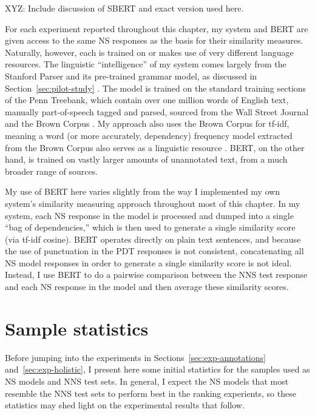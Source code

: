 XYZ: Include discussion of SBERT and exact version used here.

For each experiment reported throughout this chapter, my system and BERT are given access to the same NS responses as the basis for their similarity measures. Naturally, however, each is trained on or makes use of very different language resources. The linguistic ``intelligence'' of my system comes largely from the Stanford Parser and its pre-trained grammar model, as discussed in Section~\ref{sec:pilot-study} \cite{klein:manning:03}. The model is trained on the standard training sections of the Penn Treebank, which contain over one million words of English text, manually part-of-speech tagged and parsed, sourced from the Wall Street Journal and the Brown Corpus \cite{marcus-et-al:93}. My approach also uses the Brown Corpus for tf-idf, meaning a word (or more accurately, dependency) frequency model extracted from the Brown Corpus also serves as a linguistic resource \cite{kucera:francis:67}. BERT, on the other hand, is trained on vastly larger amounts of unannotated text, from a much broader range of sources.

My use of BERT here varies slightly from the way I implemented my own system's similarity measuring approach throughout most of this chapter. In my system, each NS response in the model is processed and dumped into a single ``bag of dependencies,'' which is then used to generate a single similarity score (via tf-idf cosine). BERT operates directly on plain text sentences, and because the use of punctuation in the PDT responses is not consistent, concatenating all NS model responses in order to generate a single similarity score is not ideal. Instead, I use BERT to do a pairwise comparison between the NNS test response and each NS response in the model and then average these similarity scores.


\section{Sample statistics}
\label{sec:sample-stats}
Before jumping into the experiments in Sections~\ref{sec:exp-annotations} and~\ref{sec:exp-holistic}, I present here some initial statistics for the samples used as NS models and NNS test sets. In general, I expect the NS models that most resemble the NNS test sets to perform best in the ranking experients, so these statistics may shed light on the experimental results that follow.

